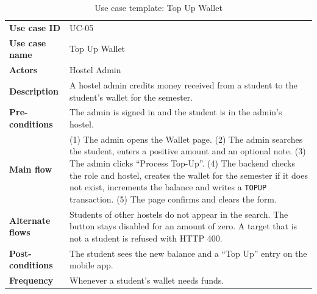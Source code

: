 \documentclass[11pt,a4paper]{article}
\begin{document}
\begin{table}[H]
\centering
\caption{Use case template: Top Up Wallet}
\label{tab:uc5}
\begin{tabular}{@{}L{3.1cm}L{11.7cm}@{}}
\toprule
\textbf{Use case ID} & UC-05\\
\textbf{Use case name} & Top Up Wallet\\
\textbf{Actors} & Hostel Admin\\
\textbf{Description} & A hostel admin credits money received from a student to
the student's wallet for the semester.\\
\textbf{Pre-conditions} & The admin is signed in and the student is in the
admin's hostel.\\
\textbf{Main flow} & (1) The admin opens the Wallet page. (2) The admin searches
the student, enters a positive amount and an optional note. (3) The admin
clicks ``Process Top-Up''. (4) The backend checks the role and hostel, creates
the wallet for the semester if it does not exist, increments the balance and
writes a \texttt{TOPUP} transaction. (5) The page confirms and clears the form.\\
\textbf{Alternate flows} & Students of other hostels do not appear in the search.
The button stays disabled for an amount of zero. A target that is not a student
is refused with HTTP 400.\\
\textbf{Post-conditions} & The student sees the new balance and a ``Top Up''
entry on the mobile app.\\
\textbf{Frequency} & Whenever a student's wallet needs funds.\\
\bottomrule
\end{tabular}
\end{table}
\end{document}

